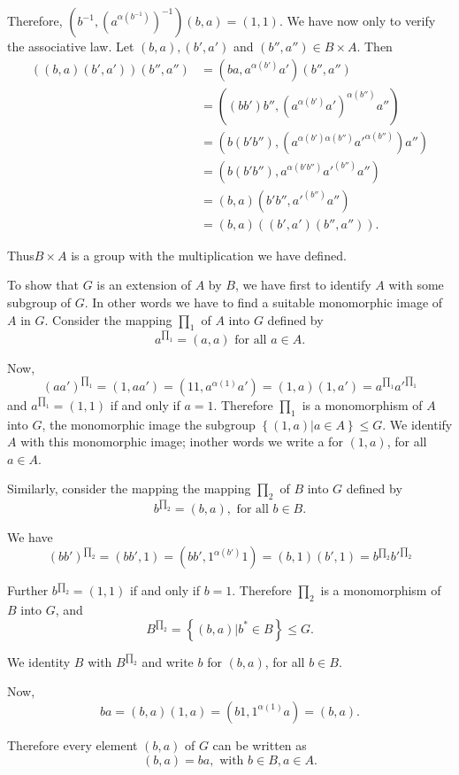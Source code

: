 Therefore, $(b^{-1}, (a^{\alpha(b^{-1})})^{-1})(b, a) =(1, 1)$. We have
now only to verify the associative law. Let $(b, a), (b', a')$ and
$(b'', a'') \in  B \times A$. Then  
\begin{align*}
((b, a)(b', a'))(b'', a'') &=(ba, a ^{\alpha(b')}a')(b'', a'') \\
  &=((bb')b'', (a^{\alpha (b')}a')^{\alpha (b'')}a '') \\
  &= (b(b'b''), (a^{\alpha (b') \alpha (b'') }a'^{\alpha (b'')}) a'') \\
  &=(b(b'b''),  a^{\alpha (b' b'')}a'^{(b'')} a'') \\
  &=(b,a)(b'b'', a'^{(b'')} a'') \\
  &= (b,a) ((b',a')(b'',a'')). 
\end{align*}

Thus\pageoriginale $B \times A$ is a group with the multiplication we have defined.

To show that $G$ is an extension of  $A$ by $B$, we have first to
identify $A$ with some subgroup of $G$. In other words we have to find
a suitable monomorphic image of $A$ in $G$. Consider the mapping
$\prod_1$ of $A$ into $G$ defined by 
$$
a^{\prod_1} = (a,a) \text{ for all } a \in  A.
$$

Now,
$$
(aa')^{\prod_1}= (1,aa') = (11,a^{\alpha(1)} a') = (1,a)(1,a') =
a^{\prod_1} {a'}^{\prod_1} 
$$
and $a^{\prod_1}= (1, 1)$ if and only if $a=1$. Therefore $\prod_1$ is
a monomorphism of $A$ into $G$, the monomorphic image the subgroup
$\left\{ (1, a) \bigg | a \in  A \right\} \le G$. We identify
$A$ with this monomorphic image; in\pageoriginale other words we write a for $(1,
a)$, for all $a \in  A$. 

Similarly, consider the mapping the mapping $\prod_2$ of $B$ into $G$
defined by 
$$
b^{\prod _2} = (b,a), \text{ for all } b \in  B.
$$

We have 
$$
(bb')^{\prod_2} = (bb',1) = (bb', 1^{\alpha (b')}1) = (b,1)(b',1)=
b^{\prod_2} {b'}^{\prod_2} 
$$

Further $b^{\prod_2}= (1, 1)$ if and only if $b=1$. Therefore $\prod_2$
is a monomorphism of $B$ into $G$, and  
$$
B^{\prod_2}= \left\{ (b,a) \bigg| b^* \in  B \right\} \le G.
$$

We identity $B$ with $B^{\prod_2}$ and write $b$ for $(b, a)$, for all
$b \in  B$. 

Now, 
$$
ba= (b, a) (1, a)= (b1,1^{\alpha (1)}a) = (b, a).
$$ 

Therefore every element $(b,a)$ of $G$ can be written as 
$$
(b, a)= ba, \text{ with } b \in  B, a  \in  A.
$$

